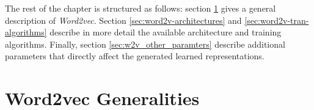The rest of the chapter is structured as follows: section
\ref{sec:word2v-generalities} gives a general description of
\textit{Word2vec}.  Section \ref{sec:word2v-architectures} and
\ref{sec:word2v-tran-algorithms} describe in more detail the available
architecture and training algorithms. Finally, section
\ref{sec:w2v_other_paramters} describe additional  parameters that
directly affect the generated learned representations.








\section{Word2vec Generalities}
\label{sec:word2v-generalities}


